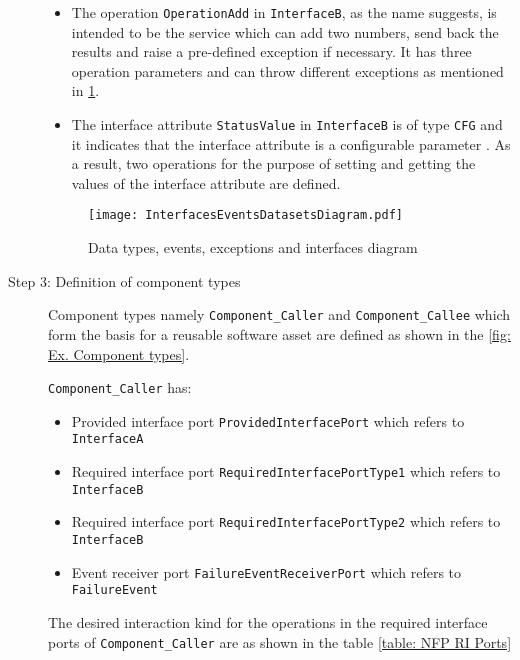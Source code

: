 \begin{description}
\begin{itemize}
\item The operation \texttt{OperationAdd} in \texttt{InterfaceB}, as the name suggests, is intended to be the service which can add two numbers, send back the results and raise a pre-defined exception if necessary. It has three operation parameters and can throw different exceptions as mentioned in \cref{fig: Ex. Datatypes etc.}. 

\item The interface attribute \texttt{StatusValue} in \texttt{InterfaceB} is of type \texttt{CFG} and it indicates that the interface attribute is a configurable parameter \cite{SpecMetamodel}. As a result, two operations for the purpose of setting and getting the values of the interface attribute are defined.      
\end{itemize}

\begin{figure}[h]
	\centering
	\texttt{[image: InterfacesEventsDatasetsDiagram.pdf]}
	\caption{Data types, events, exceptions and interfaces diagram}
	\label{fig: Ex. Datatypes etc.}
\end{figure}

\item [Step 3: Definition of component types] Component types namely \texttt{Component\allowbreak\_Caller} and \texttt{Component\allowbreak\_Callee} which form the basis for a reusable software asset are defined as shown in the \cref{fig: Ex. Component types}. 

\texttt{Component\allowbreak\_Caller} has:
\begin{itemize}
\item Provided interface port \texttt{Provided\allowbreak Interface\allowbreak Port} which refers to \texttt{InterfaceA}
\item Required interface port \texttt{Required\allowbreak Interface\allowbreak PortType1} which refers to \texttt{InterfaceB}
\item Required interface port \texttt{Required\allowbreak Interface\allowbreak PortType2} which refers to \texttt{InterfaceB}
\item Event receiver port \texttt{FailureEvent\allowbreak ReceiverPort} which refers to \texttt{Failure\allowbreak Event}
\end{itemize}

The desired interaction kind for the operations in the required interface ports of \texttt{Component\allowbreak\_Caller} are as shown in the table \cref{table: NFP RI Ports}


\end{description}

